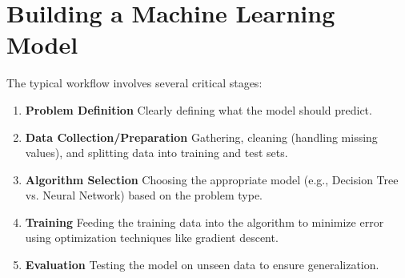 \documentclass[12pt]{article}
\begin{document}
\section{Building a Machine Learning Model}
The typical workflow involves several critical stages:
\begin{enumerate}
  \item \textbf{Problem Definition} Clearly defining what the model should predict.
  \item \textbf{Data Collection/Preparation} Gathering, cleaning (handling missing values), and splitting data into training and test sets.
  \item \textbf{Algorithm Selection} Choosing the appropriate model (e.g., Decision Tree vs. Neural Network) based on the problem type.
  \item \textbf{Training} Feeding the training data into the algorithm to minimize error using optimization techniques like gradient descent.
  \item \textbf{Evaluation} Testing the model on unseen data to ensure generalization.
\end{enumerate}
\end{document}
